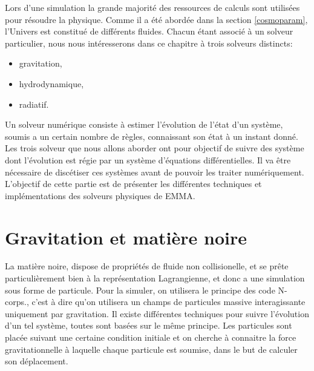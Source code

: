 Lors d'une simulation la grande majorité des ressources de calculs sont utilisées pour résoudre la physique.
Comme il a été abordée dans la section \ref{cosmoparam}, l'Univers est constitué de différents fluides.
Chacun étant associé à un solveur particulier, nous nous intéresserons dans ce chapitre à trois solveurs distincts:
\begin{itemize}
\item gravitation,
\item hydrodynamique,
\item radiatif.
\end{itemize}



Un solveur numérique consiste à estimer l'évolution de l'état d'un système, soumis a un certain nombre de règles, connaissant son état à un instant donné.
Les trois solveur que nous allons aborder ont pour objectif de suivre des système dont l'évolution est régie par un système d'équations différentielles.
Il va être nécessaire de discétiser ces systèmes avant de pouvoir les traiter numériquement.
L'objectif de cette partie est de présenter les différentes techniques et implémentations des solveurs physiques de EMMA.

\section{Gravitation et matière noire}
\label{sec:solverDM}
La matière noire, dispose de propriétés de fluide non collisionelle, et se prête particulièrement bien à la représentation Lagrangienne, et donc a une simulation sous forme de particule.
Pour la simuler, on utilisera le principe des code N-corps., c'est à dire qu'on utilisera un champs de particules massive interagissante uniquement par gravitation.
Il existe différentes techniques pour suivre l'évolution d'un tel système, toutes sont basées sur le même principe.
Les particules sont placée suivant une certaine condition initiale et on cherche à connaitre la force gravitationnelle à laquelle chaque particule est soumise, dans le but de calculer son déplacement.

